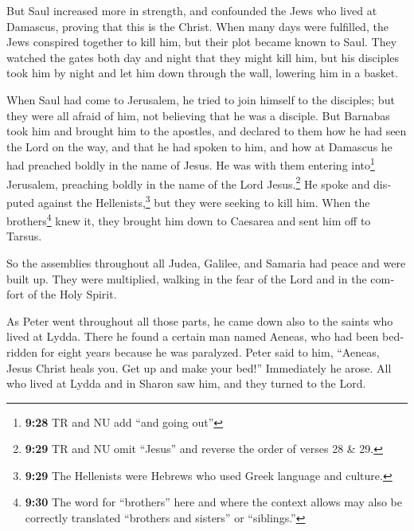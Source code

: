 \begin{paracol}{2}
\begin{otherlanguage}{english}
 But Saul increased more in strength, and confounded the
Jews who lived at Damascus, proving that this is the Christ.
 When many days were fulfilled, the Jews conspired
together to kill him,  but their plot became known to
Saul. They watched the gates both day and night that they might kill
him,  but his disciples took him by night and let him
down through the wall, lowering him in a basket.

 When Saul had come to Jerusalem, he tried to join
himself to the disciples; but they were all afraid of him, not believing
that he was a disciple.  But Barnabas took him and
brought him to the apostles, and declared to them how he had seen the
Lord on the way, and that he had spoken to him, and how at Damascus he
had preached boldly in the name of Jesus.  He was with
them entering into\footnote{\textbf{9:28} TR and NU add ``and going
  out''} Jerusalem,  preaching boldly in the name of the
Lord Jesus.\footnote{\textbf{9:29} TR and NU omit ``Jesus'' and reverse
  the order of verses 28 \& 29.} He spoke and disputed against the
Hellenists,\footnote{\textbf{9:29} The Hellenists were Hebrews who used
  Greek language and culture.} but they were seeking to kill him.
 When the brothers\footnote{\textbf{9:30} The word for
  ``brothers'' here and where the context allows may also be correctly
  translated ``brothers and sisters'' or ``siblings.''} knew it, they
brought him down to Caesarea and sent him off to Tarsus.

 So the assemblies throughout all Judea, Galilee, and
Samaria had peace and were built up. They were multiplied, walking in
the fear of the Lord and in the comfort of the Holy Spirit.

 As Peter went throughout all those parts, he came down
also to the saints who lived at Lydda.  There he found a
certain man named Aeneas, who had been bedridden for eight years because
he was paralyzed.  Peter said to him, ``Aeneas, Jesus
Christ heals you. Get up and make your bed!'' Immediately he arose.
 All who lived at Lydda and in Sharon saw him, and they
turned to the Lord.


\end{otherlanguage}
\end{paracol}
